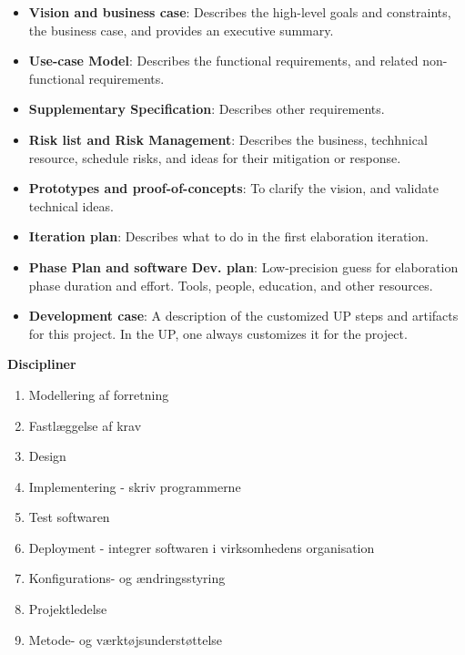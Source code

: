 \begin{itemize}

	\item{\textbf{Vision and business case}: Describes the high-level goals and constraints,
	            the business case, and provides an executive summary.}

	\item{\textbf{Use-case Model}: Describes the functional requirements, and related non-functional requirements.}

	\item{\textbf{Supplementary Specification}: Describes other requirements.}

	\item{\textbf{Risk list and Risk Management}: Describes the business,
	            techhnical resource, schedule risks, and ideas for their mitigation or response.}

	\item{\textbf{Prototypes and proof-of-concepts}: To clarify the vision, and validate technical ideas.}

	\item{\textbf{Iteration plan}: Describes what to do in the first elaboration iteration.}

	\item{\textbf{Phase Plan and software Dev. plan}: Low-precision guess for
	            elaboration phase duration and effort. Tools, people, education, and other resources.}

	\item{\textbf{Development case}: A description of the customized UP steps and artifacts
	            for this project. In the UP, one always customizes it for the project.}

\end{itemize}




\textbf{Discipliner}

\begin{enumerate}
	\item{Modellering af forretning}
	\item{Fastlæggelse af krav}
	\item{Design}
	\item{Implementering - skriv programmerne}
	\item{Test softwaren}
	\item{Deployment - integrer softwaren i virksomhedens organisation}
	\item{Konfigurations- og ændringsstyring}
	\item{Projektledelse}
	\item{Metode- og værktøjsunderstøttelse}
\end{enumerate}


